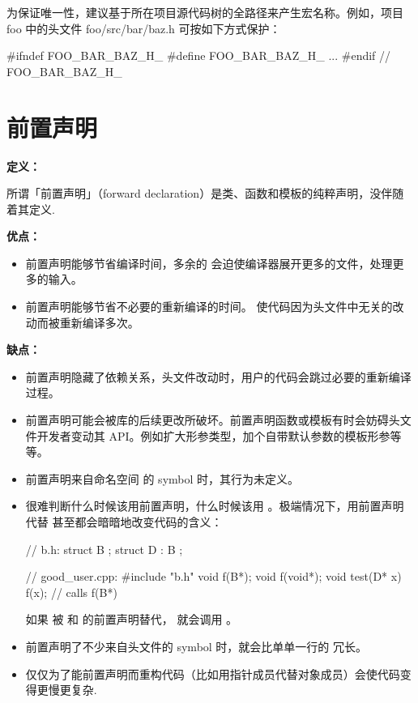 为保证唯一性，建议基于所在项目源代码树的全路径来产生宏名称。例如，项目 foo 中的头文件 foo/src/bar/baz.h 可按如下方式保护：

\begin{cppcode}
  #ifndef FOO_BAR_BAZ_H_
  #define FOO_BAR_BAZ_H_
  ...
  #endif // FOO_BAR_BAZ_H_
\end{cppcode}

\section{前置声明} \label{forward-declarations}


\textbf{定义：}

所谓「前置声明」（forward declaration）是类、函数和模板的纯粹声明，没伴随着其定义.

\textbf{优点：}

\begin{itemize}
	\item 前置声明能够节省编译时间，多余的  会迫使编译器展开更多的文件，处理更多的输入。
	\item 前置声明能够节省不必要的重新编译的时间。  使代码因为头文件中无关的改动而被重新编译多次。
\end{itemize}

\textbf{缺点：}

\begin{itemize}
	\item 前置声明隐藏了依赖关系，头文件改动时，用户的代码会跳过必要的重新编译过程。
	\item 前置声明可能会被库的后续更改所破坏。前置声明函数或模板有时会妨碍头文件开发者变动其 API。例如扩大形参类型，加个自带默认参数的模板形参等等。
	\item 前置声明来自命名空间  的 symbol 时，其行为未定义。
	\item 很难判断什么时候该用前置声明，什么时候该用  。极端情况下，用前置声明代替  甚至都会暗暗地改变代码的含义：

\begin{cppcode}
// b.h:
struct B {};
struct D : B {};

// good_user.cpp:
#include "b.h"
void f(B*);
void f(void*);
void test(D* x) { f(x); }  // calls f(B*)
\end{cppcode}

	      如果  被  和  的前置声明替代，  就会调用  。	\item 前置声明了不少来自头文件的 symbol 时，就会比单单一行的  冗长。
	\item 仅仅为了能前置声明而重构代码（比如用指针成员代替对象成员）会使代码变得更慢更复杂.
\end{itemize}

